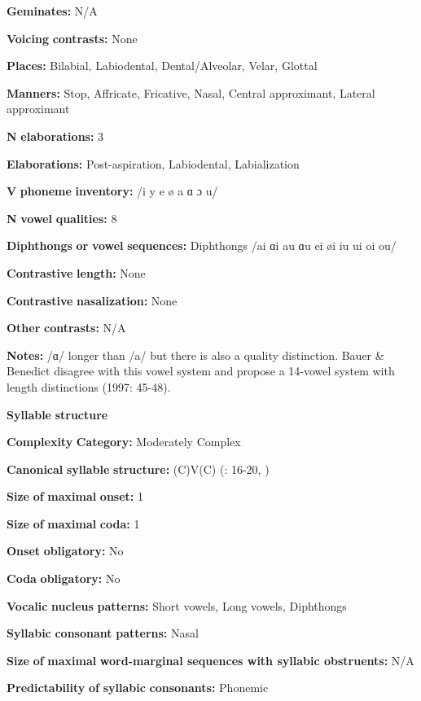 \begin{styleBody}
\textbf{Geminates:} N/A

\textbf{Voicing} \textbf{contrasts:} None

\textbf{Places:} Bilabial, Labiodental, Dental/Alveolar, Velar, Glottal

\textbf{Manners:} Stop, Affricate, Fricative, Nasal, Central approximant, Lateral approximant

\textbf{N} \textbf{elaborations:} 3

\textbf{Elaborations:} Post-aspiration, Labiodental, Labialization

\textbf{V} \textbf{phoneme} \textbf{inventory:} /i y e ø a ɑ ɔ u/

\textbf{N} \textbf{vowel} \textbf{qualities:} 8

\textbf{Diphthongs} \textbf{or} \textbf{vowel} \textbf{sequences:} Diphthongs /ai ɑi au ɑu ei øi iu ui oi ou/

\textbf{Contrastive} \textbf{length:} None

\textbf{Contrastive} \textbf{nasalization:} None

\textbf{Other} \textbf{contrasts:} N/A

\textbf{Notes:} /ɑ/ longer than /a/ but there is also a quality distinction. Bauer \& Benedict disagree with this vowel system and propose a 14-vowel system with length distinctions (1997: 45-48).

\textbf{Syllable} \textbf{structure}

\textbf{Complexity} \textbf{Category:} Moderately Complex

\textbf{Canonical} \textbf{syllable} \textbf{structure:} (C)V(C) (\citealt{MatthewsYip1994}: 16-20, \citealt{BauerBenedict1997})

\textbf{Size} \textbf{of} \textbf{maximal} \textbf{onset:} 1

\textbf{Size} \textbf{of} \textbf{maximal} \textbf{coda:} 1

\textbf{Onset} \textbf{obligatory:} No

\textbf{Coda} \textbf{obligatory:} No

\textbf{Vocalic} \textbf{nucleus} \textbf{patterns:} Short vowels, Long vowels, Diphthongs

\textbf{Syllabic} \textbf{consonant} \textbf{patterns:} Nasal

\textbf{Size} \textbf{of} \textbf{maximal} \textbf{word{}-marginal sequences with syllabic obstruents:} N/A

\textbf{Predictability} \textbf{of} \textbf{syllabic} \textbf{consonants:} Phonemic


\end{styleBody}
